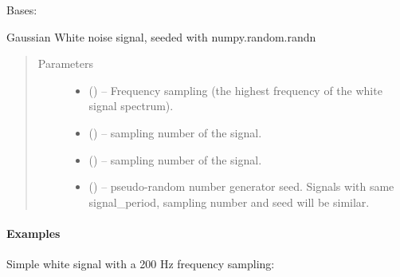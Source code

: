 \documentclass[letterpaper,10pt,english]{sphinxmanual}
\begin{document}
\begin{fulllineitems}
\label{\detokenize{triflow.plugins:triflow.plugins.signals.GaussianWhiteNoise}}
Bases: {\hyperref[\detokenize{triflow.plugins:triflow.plugins.signals.Signal}]{}}

Gaussian White noise signal, seeded with numpy.random.randn
\begin{quote}\begin{description}
\item[{Parameters}] \leavevmode\begin{itemize}
\item {} 
 () -- Frequency sampling (the highest frequency of the white signal spectrum).

\item {} 
 (\sphinxstyleliteralemphasis{, }\sphinxstyleliteralemphasis{, }) -- sampling number of the signal.

\item {} 
 (\sphinxstyleliteralemphasis{, }\sphinxstyleliteralemphasis{, }) -- sampling number of the signal.

\item {} 
 (\sphinxstyleliteralemphasis{, }) -- pseudo-random number generator seed. Signals with same signal\_period, sampling number and seed will be similar.

\end{itemize}

\end{description}\end{quote}
\paragraph{Examples}

Simple white signal with a 200 Hz frequency sampling:


\end{fulllineitems}
\end{document}
